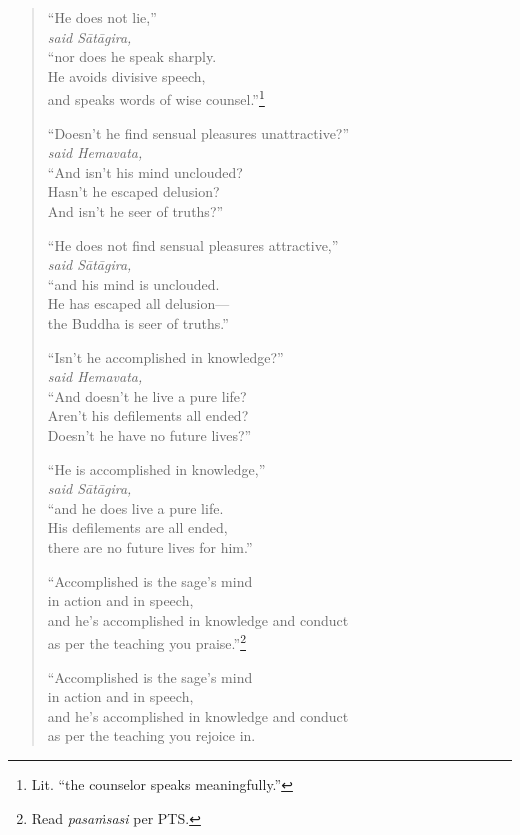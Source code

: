 \documentclass[12pt,openany]{book}%
\newcommand*{\scspeaker}[1]{\hspace{2em}\textit{#1}}
\begin{document}
\begin{verse}
“He does not lie,” \\
\scspeaker{said \textsanskrit{Sātāgira}, }\\
“nor does he speak sharply. \\
He avoids divisive speech, \\
and speaks words of wise counsel.”\footnote{Lit. “the counselor speaks meaningfully.” } 

“Doesn’t he find sensual pleasures unattractive?” \\
\scspeaker{said Hemavata, }\\
“And isn’t his mind unclouded? \\
Hasn’t he escaped delusion? \\
And isn’t he seer of truths?” 

“He does not find sensual pleasures attractive,” \\
\scspeaker{said \textsanskrit{Sātāgira}, }\\
“and his mind is unclouded. \\
He has escaped all delusion—\\
the Buddha is seer of truths.” 

“Isn’t he accomplished in knowledge?” \\
\scspeaker{said Hemavata, }\\
“And doesn’t he live a pure life? \\
Aren’t his defilements all ended? \\
Doesn’t he have no future lives?” 

“He is accomplished in knowledge,” \\
\scspeaker{said \textsanskrit{Sātāgira}, }\\
“and he does live a pure life. \\
His defilements are all ended, \\
there are no future lives for him.” 

“Accomplished is the sage’s mind \\
in action and in speech, \\
and he’s accomplished in knowledge and conduct \\
as per the teaching you praise.”\footnote{Read \textit{\textsanskrit{pasaṁsasi}} per PTS. } 

“Accomplished is the sage’s mind \\
in action and in speech, \\
and he’s accomplished in knowledge and conduct \\
as per the teaching you rejoice in. 


\end{verse}
\end{document}
